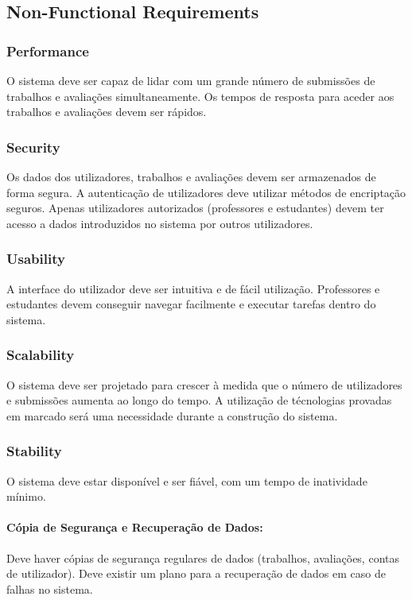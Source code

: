 \documentclass[10pt]{article}
\begin{document}
\newpage

\subsection{Non-Functional Requirements}

\subsubsection{Performance}
O sistema deve ser capaz de lidar com um grande número de submissões de trabalhos e avaliações simultaneamente. 
Os tempos de resposta para aceder aos trabalhos e avaliações devem ser rápidos.

\subsubsection{Security}
Os dados dos utilizadores, trabalhos e avaliações devem ser armazenados de forma segura. 
A autenticação de utilizadores deve utilizar métodos de encriptação seguros. 
Apenas utilizadores autorizados (professores e estudantes) devem ter acesso a dados introduzidos no sistema por outros 
utilizadores.

\subsubsection{Usability}
A interface do utilizador deve ser intuitiva e de fácil utilização.
Professores e estudantes devem conseguir navegar facilmente e executar tarefas dentro do sistema.

\subsubsection{Scalability}
O sistema deve ser projetado para crescer à medida que o número de utilizadores e submissões aumenta ao longo do tempo.
A utilização de técnologias provadas em marcado será uma necessidade durante a construção do sistema.

\subsubsection{Stability}
O sistema deve estar disponível e ser fiável, com um tempo de inatividade mínimo.

\paragraph{Cópia de Segurança e Recuperação de Dados:}
Deve haver cópias de segurança regulares de dados (trabalhos, avaliações, contas de utilizador).
Deve existir um plano para a recuperação de dados em caso de falhas no sistema.
\end{document}
